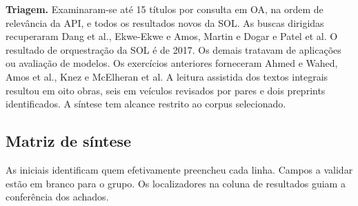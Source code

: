 \documentclass[12pt,a4paper]{article}
\begin{document}
\medskip
\noindent\textbf{Triagem.} Examinaram-se até 15 títulos por consulta em OA, na ordem de relevância da API, e todos os resultados novos da SOL. As buscas dirigidas recuperaram Dang et al., Ekwe-Ekwe e Amos, Martin e Dogar e Patel et al. O resultado de orquestração da SOL é de 2017. Os demais tratavam de aplicações ou avaliação de modelos. Os exercícios anteriores forneceram Ahmed e Wahed, Amos et al., Knez e McElheran et al. A leitura assistida dos textos integrais resultou em oito obras, seis em veículos revisados por pares e dois preprints identificados. A síntese tem alcance restrito ao corpus selecionado.
\par\endgroup

\begin{landscape}
\section{Matriz de síntese}

As iniciais identificam quem efetivamente preencheu cada linha. Campos a validar estão em branco para o grupo. Os localizadores na coluna de resultados guiam a conferência dos achados.


\end{landscape}
\end{document}
